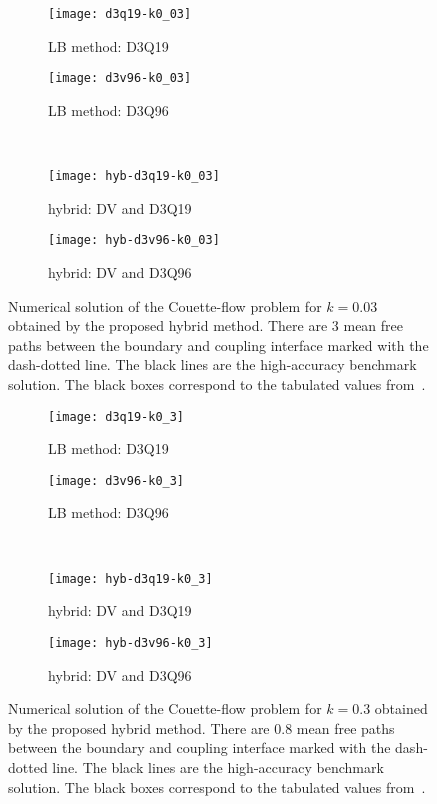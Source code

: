 \documentclass{elsarticle} %
\begin{document}
\begin{figure}
    \centering
    \begin{subfigure}[b]{0.5\textwidth}
        \texttt{[image: d3q19-k0\_03]}
        \caption{LB method: D3Q19}
        \label{fig:d3q19-k003}
    \end{subfigure}%
    \begin{subfigure}[b]{0.5\textwidth}
        \texttt{[image: d3v96-k0\_03]}
        \caption{LB method: D3Q96}
        \label{fig:d3v96-k003}
    \end{subfigure}\\
    \begin{subfigure}[b]{0.5\textwidth}
        \texttt{[image: hyb-d3q19-k0\_03]}
        \caption{hybrid: DV and D3Q19}
        \label{fig:hyb:d3q19-k003}
    \end{subfigure}%
    \begin{subfigure}[b]{0.5\textwidth}
        \texttt{[image: hyb-d3v96-k0\_03]}
        \caption{hybrid: DV and D3Q96}
        \label{fig:hyb:d3v96-k003}
    \end{subfigure}
    \caption{
        Numerical solution of the Couette-flow problem for \(k=0.03\) obtained by the proposed hybrid method.
        There are \(3\) mean free paths between the boundary and coupling interface marked with the dash-dotted line.
        The black lines are the high-accuracy benchmark solution.
        The black boxes correspond to the tabulated values from~\cite{Luo2016}.
    }\label{fig:hybrid-k003}
\end{figure}

\begin{figure}
   \centering
   \begin{subfigure}[b]{0.5\textwidth}
       \texttt{[image: d3q19-k0\_3]}
       \caption{LB method: D3Q19}
       \label{fig:d3q19-k03}
   \end{subfigure}%
   \begin{subfigure}[b]{0.5\textwidth}
       \texttt{[image: d3v96-k0\_3]}
       \caption{LB method: D3Q96}
       \label{fig:d3v96-k03}
   \end{subfigure}\\
   \begin{subfigure}[b]{0.5\textwidth}
       \texttt{[image: hyb-d3q19-k0\_3]}
       \caption{hybrid: DV and D3Q19}
       \label{fig:hyb:d3q19-k03}
   \end{subfigure}%
   \begin{subfigure}[b]{0.5\textwidth}
       \texttt{[image: hyb-d3v96-k0\_3]}
       \caption{hybrid: DV and D3Q96}
       \label{fig:hyb:d3v96-k03}
   \end{subfigure}
   \caption{
       Numerical solution of the Couette-flow problem for \(k=0.3\) obtained by the proposed hybrid method.
       There are \(0.8\) mean free paths between the boundary and coupling interface marked with the dash-dotted line.
       The black lines are the high-accuracy benchmark solution.
       The black boxes correspond to the tabulated values from~\cite{Luo2016}.
   }\label{fig:hybrid03}
\end{figure}
\end{document}
